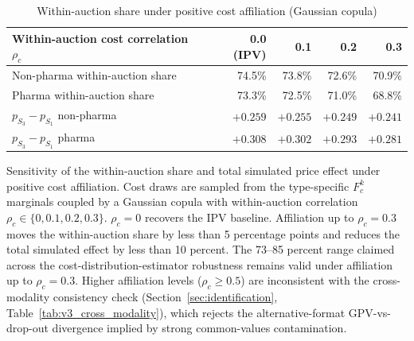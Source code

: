 \begin{table}[htbp]
\centering
\begin{threeparttable}
\caption{Within-auction share under positive cost affiliation (Gaussian copula)}
\label{tab:affiliation_sensitivity}
\footnotesize
\setlength{\tabcolsep}{4pt}
\begin{tabular}{lrrrr}
\toprule
Within-auction cost correlation $\rho_c$ & 0.0 (IPV) & 0.1 & 0.2 & 0.3 \\
\midrule
Non-pharma within-auction share & 74.5\% & 73.8\% & 72.6\% & 70.9\% \\
Pharma within-auction share & 73.3\% & 72.5\% & 71.0\% & 68.8\% \\
\midrule
$p_{S_3} - p_{S_1}$ non-pharma & $+0.259$ & $+0.255$ & $+0.249$ & $+0.241$ \\
$p_{S_3} - p_{S_1}$ pharma & $+0.308$ & $+0.302$ & $+0.293$ & $+0.281$ \\
\bottomrule
\end{tabular}
\begin{tablenotes}\footnotesize
\item Sensitivity of the within-auction share and total simulated price effect
under positive cost affiliation. Cost draws are sampled from the type-specific
$F_c^k$ marginals coupled by a Gaussian copula with within-auction correlation
$\rho_c \in \{0, 0.1, 0.2, 0.3\}$. $\rho_c = 0$ recovers the IPV baseline.
Affiliation up to $\rho_c = 0.3$ moves the within-auction share by less than
5 percentage points and reduces the total simulated effect by less than 10 percent.
The 73--85 percent range claimed across the cost-distribution-estimator robustness
remains valid under affiliation up to $\rho_c = 0.3$. Higher affiliation levels
($\rho_c \ge 0.5$) are inconsistent with the cross-modality consistency check
(Section~\ref{sec:identification}, Table~\ref{tab:v3_cross_modality}), which
rejects the alternative-format GPV-vs-drop-out divergence implied by strong
common-values contamination.
\end{tablenotes}
\end{threeparttable}
\end{table}
